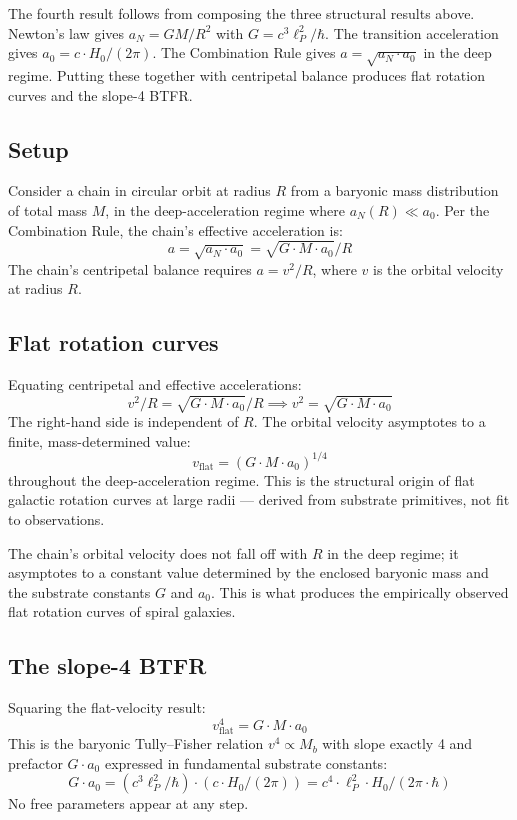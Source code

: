 \documentclass[11pt,a4paper]{article}
\begin{document}
The fourth result follows from composing the three structural results above. Newton's law gives $a_N = GM/R^2$ with $G = c^3\ell_P^2/\hbar$. The transition acceleration gives $a_0 = c\cdot H_0/(2\pi)$. The Combination Rule gives $a = \sqrt{a_N \cdot a_0}$ in the deep regime. Putting these together with centripetal balance produces flat rotation curves and the slope-4 BTFR.

\subsection{Setup}

Consider a chain in circular orbit at radius $R$ from a baryonic mass distribution of total mass $M$, in the deep-acceleration regime where $a_N(R) \ll a_0$. Per the Combination Rule, the chain's effective acceleration is:
\[
a = \sqrt{a_N \cdot a_{0}} = \sqrt{G \cdot M \cdot a_{0}} / R
\]
The chain's centripetal balance requires $a = v^2/R$, where $v$ is the orbital velocity at radius $R$.

\subsection{Flat rotation curves}

Equating centripetal and effective accelerations:
\[
v^{2} / R = \sqrt{G \cdot M \cdot a_{0}} / R \implies v^{2} = \sqrt{G \cdot M \cdot a_{0}}
\]
The right-hand side is independent of $R$. The orbital velocity asymptotes to a finite, mass-determined value:
\[
v_{\mathrm{flat}} = (G \cdot M \cdot a_{0})^{1/4}
\]
throughout the deep-acceleration regime. This is the structural origin of flat galactic rotation curves at large radii --- derived from substrate primitives, not fit to observations.

The chain's orbital velocity does not fall off with $R$ in the deep regime; it asymptotes to a constant value determined by the enclosed baryonic mass and the substrate constants $G$ and $a_0$. This is what produces the empirically observed flat rotation curves of spiral galaxies.

\subsection{The slope-4 BTFR}

Squaring the flat-velocity result:
\[
v_{\mathrm{flat}}^{4} = G \cdot M \cdot a_{0}
\]
This is the baryonic Tully--Fisher relation $v^4 \propto M_b$ with slope exactly 4 and prefactor $G\cdot a_0$ expressed in fundamental substrate constants:
\[
G \cdot a_{0} = (c^{3}\ell_P^{2}/\hbar)\cdot(c \cdot H_{0}/(2\pi)) = c^{4} \cdot \ell_P^{2} \cdot H_{0} / (2\pi \cdot \hbar)
\]
No free parameters appear at any step.
\end{document}
